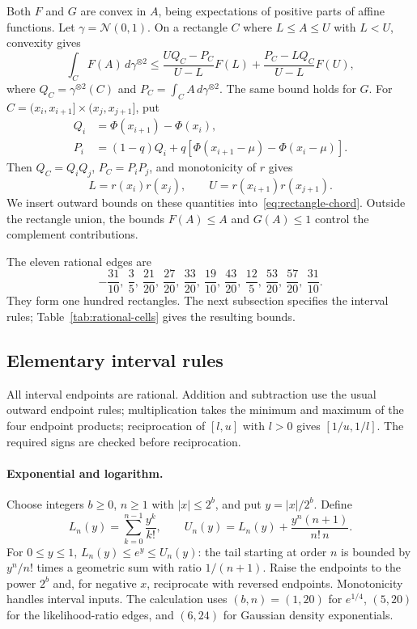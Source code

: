 \documentclass[11pt]{article}
\theoremstyle{remark}
\newcommand{\Normal}{\mathcal N}
\begin{document}
Both $F$ and $G$ are convex in $A$, being expectations of positive parts of
affine functions. Let $\gamma=\Normal(0,1)$. On a rectangle $C$ where
$L\leq A\leq U$ with $L<U$, convexity gives
\begin{equation}\label{eq:rectangle-chord}
 \int_C F(A)\,d\gamma^{\otimes2}
 \leq\frac{UQ_C-P_C}{U-L}F(L)
      +\frac{P_C-LQ_C}{U-L}F(U),
\end{equation}
where $Q_C=\gamma^{\otimes2}(C)$ and
$P_C=\int_C A\,d\gamma^{\otimes2}$. The same bound holds for $G$.
For $C=(x_i,x_{i+1}]\times(x_j,x_{j+1}]$, put
\begin{align*}
 Q_i&=\Phi(x_{i+1})-\Phi(x_i),\\
 P_i&=(1-q)Q_i+q[\Phi(x_{i+1}-\mu)-\Phi(x_i-\mu)].
\end{align*}
Then $Q_C=Q_iQ_j$, $P_C=P_iP_j$, and monotonicity of $r$ gives
\[
 L=r(x_i)r(x_j),\qquad U=r(x_{i+1})r(x_{j+1}).
\]
We insert outward bounds on these quantities into~\eqref{eq:rectangle-chord}.
Outside the rectangle union, the bounds $F(A)\leq A$ and $G(A)\leq1$ control
the complement contributions.

The eleven rational edges are
\[
 -\frac{31}{10},\ \frac35,\ \frac{21}{20},\ \frac{27}{20},\
 \frac{33}{20},\ \frac{19}{10},\ \frac{43}{20},\ \frac{12}{5},\
 \frac{53}{20},\ \frac{57}{20},\ \frac{31}{10}.
\]
They form one hundred rectangles. The next subsection specifies the
interval rules; Table~\ref{tab:rational-cells} gives the resulting bounds.

\subsection{Elementary interval rules}
All interval endpoints are rational. Addition and subtraction use the usual
outward endpoint rules; multiplication takes the minimum and maximum of the
four endpoint products; reciprocation of $[l,u]$ with $l>0$ gives
$[1/u,1/l]$. The required signs are checked before reciprocation.

\paragraph{Exponential and logarithm.}
Choose integers $b\geq0$, $n\geq1$ with $|x|\leq2^b$, and put
$y=|x|/2^b$. Define
\[
 L_n(y)=\sum_{k=0}^{n-1}\frac{y^k}{k!},\qquad
 U_n(y)=L_n(y)+\frac{y^n(n+1)}{n!\,n}.
\]
For $0\leq y\leq1$,
$L_n(y)\leq e^y\leq U_n(y)$: the tail starting at order $n$ is bounded by
$y^n/n!$ times a geometric sum with ratio $1/(n+1)$. Raise the endpoints to
the power $2^b$ and, for negative $x$, reciprocate with reversed endpoints.
Monotonicity handles interval inputs. The calculation uses $(b,n)=(1,20)$
for $e^{1/4}$, $(5,20)$ for the likelihood-ratio edges, and $(6,24)$ for
Gaussian density exponentials.
\end{document}
